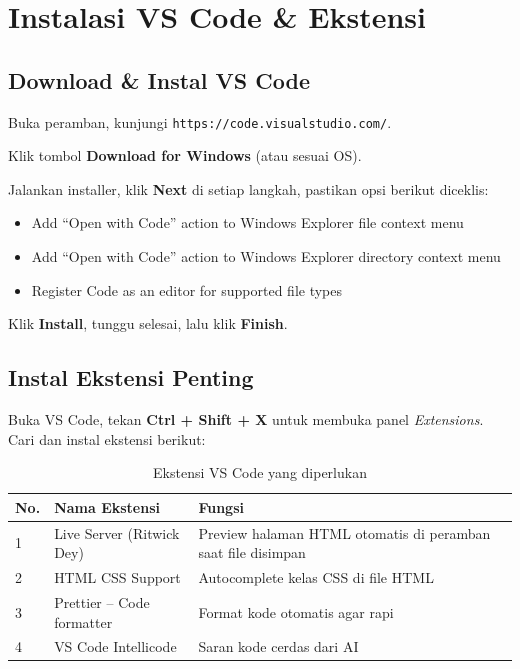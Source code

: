 \section{Instalasi VS Code \& Ekstensi}
\label{sec:m01-instalasi}

\subsection{Download \& Instal VS Code}

\begin{langkah}
  \item Buka peramban, kunjungi \texttt{https://code.visualstudio.com/}.
  \item Klik tombol \textbf{Download for Windows} (atau sesuai OS).
  \item Jalankan installer, klik \textbf{Next} di setiap langkah, pastikan opsi berikut diceklis:
  \begin{itemize}
    \item Add ``Open with Code'' action to Windows Explorer file context menu
    \item Add ``Open with Code'' action to Windows Explorer directory context menu
    \item Register Code as an editor for supported file types
  \end{itemize}
  \item Klik \textbf{Install}, tunggu selesai, lalu klik \textbf{Finish}.
\end{langkah}

\subsection{Instal Ekstensi Penting}

Buka VS Code, tekan \textbf{Ctrl + Shift + X} untuk membuka panel \emph{Extensions}. Cari dan instal ekstensi berikut:

\begin{table}[ht]
\centering
\caption{Ekstensi VS Code yang diperlukan}
\label{tab:m01-ekstensi}
\begin{tabular}{llp{6cm}}
\toprule
\textbf{No.} & \textbf{Nama Ekstensi} & \textbf{Fungsi} \\
\midrule
1 & Live Server (Ritwick Dey) & Preview halaman HTML otomatis di peramban saat file disimpan \\
2 & HTML CSS Support & Autocomplete kelas CSS di file HTML \\
3 & Prettier -- Code formatter & Format kode otomatis agar rapi \\
4 & VS Code Intellicode & Saran kode cerdas dari AI \\
\bottomrule
\end{tabular}
\end{table}

